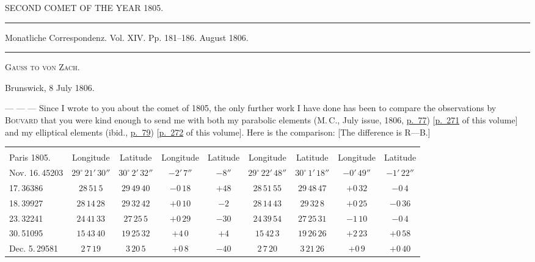 \clearpage
{}
\hypertarget{native-280-lower}{}
\begin{center}
SECOND COMET OF THE YEAR 1805.

\rule{0.6\linewidth}{0.4pt}

Monatliche Correspondenz. Vol. XIV. Pp. 181–186. August 1806.

\rule{0.6\linewidth}{0.4pt}
\end{center}

\begin{center}
\textsc{Gauss to von Zach.}
\end{center}

\begin{flushright}
Brunswick, 8 July 1806.
\end{flushright}

\noindent --- --- --- Since I wrote to you about the comet of 1805, the only further work I have done has been to compare the observations by \textsc{Bouvard} that you were kind enough to send me with both my parabolic elements (M.\,C., July issue, 1806, \href{https://www.digitale-sammlungen.de/en/view/bsb10538606?page=87}{p.~77}) [\hyperlink{native-276}{p.~271} of this volume] and my elliptical elements (ibid., \href{https://www.digitale-sammlungen.de/en/view/bsb10538606?page=89}{p.~79}) [\hyperlink{native-277}{p.~272} of this volume]. Here is the comparison: [The difference is R---B.]

\begin{center}\begingroup
\fontsize{8}{10}\selectfont
\setlength{\tabcolsep}{1pt}\renewcommand{\arraystretch}{1.12}
\begin{tabular}{l||c|c|c|c||c|c|c|c}
 &  &  &  &  \\
Paris 1805. & Longitude & Latitude & Longitude & Latitude & Longitude & Latitude & Longitude & Latitude \\
\hline
Nov. 16.\,45203 & $29^\circ\,21'\,30''$ & $30^\circ\,2'\,32''$ & $-2'\,7''$ & $-8''$ & $29^\circ\,22'\,48''$ & $30^\circ\,1'\,18''$ & $-0'\,49''$ & $-1'\,22''$ \\
17.\,36386 & $28\,51\,5$ & $29\,49\,40$ & $-0\,18$ & $+48$ & $28\,51\,55$ & $29\,48\,47$ & $+0\,32$ & $-0\,4$ \\
18.\,39927 & $28\,14\,28$ & $29\,32\,42$ & $+0\,10$ & $-2$ & $28\,14\,43$ & $29\,32\,8$ & $+0\,25$ & $-0\,36$ \\
23.\,32241 & $24\,41\,33$ & $27\,25\,5$ & $+0\,29$ & $-30$ & $24\,39\,54$ & $27\,25\,31$ & $-1\,10$ & $-0\,4$ \\
30.\,51095 & $15\,43\,40$ & $19\,25\,32$ & $+4\,0$ & $+4$ & $15\,42\,3$ & $19\,26\,26$ & $+2\,23$ & $+0\,58$ \\
Dec. 5.\,29581 & $2\,7\,19$ & $3\,20\,5$ & $+0\,8$ & $-40$ & $2\,7\,20$ & $3\,21\,26$ & $+0\,9$ & $+0\,40$ \\
\end{tabular}\endgroup\end{center}

